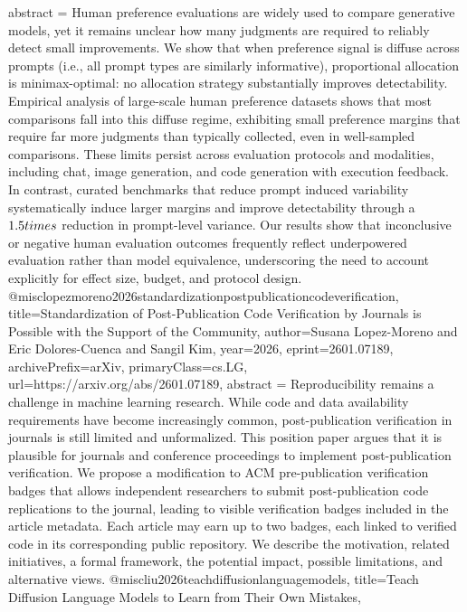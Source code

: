 {      abstract = {Human preference evaluations are widely used to compare generative models, yet it remains unclear how many judgments are required to reliably detect small improvements. We show that when preference signal is diffuse across prompts (i.e., all prompt types are similarly informative), proportional allocation is minimax-optimal: no allocation strategy substantially improves detectability. Empirical analysis of large-scale human preference datasets shows that most comparisons fall into this diffuse regime, exhibiting small preference margins that require far more judgments than typically collected, even in well-sampled comparisons. These limits persist across evaluation protocols and modalities, including chat, image generation, and code generation with execution feedback. In contrast, curated benchmarks that reduce prompt induced variability systematically induce larger margins and improve detectability through a $1.5\\times$ reduction in prompt-level variance. Our results show that inconclusive or negative human evaluation outcomes frequently reflect underpowered evaluation rather than model equivalence, underscoring the need to account explicitly for effect size, budget, and protocol design.}
}@misc{lopezmoreno2026standardizationpostpublicationcodeverification,
      title={Standardization of Post-Publication Code Verification by Journals is Possible with the Support of the Community}, 
      author={Susana Lopez-Moreno and Eric Dolores-Cuenca and Sangil Kim},
      year={2026},
      eprint={2601.07189},
      archivePrefix={arXiv},
      primaryClass={cs.LG},
      url={https://arxiv.org/abs/2601.07189},
      abstract = {Reproducibility remains a challenge in machine learning research. While code and data availability requirements have become increasingly common, post-publication verification in journals is still limited and unformalized. This position paper argues that it is plausible for journals and conference proceedings to implement post-publication verification. We propose a modification to ACM pre-publication verification badges that allows independent researchers to submit post-publication code replications to the journal, leading to visible verification badges included in the article metadata. Each article may earn up to two badges, each linked to verified code in its corresponding public repository. We describe the motivation, related initiatives, a formal framework, the potential impact, possible limitations, and alternative views.}
}@misc{liu2026teachdiffusionlanguagemodels,
      title={Teach Diffusion Language Models to Learn from Their Own Mistakes}, 
}
